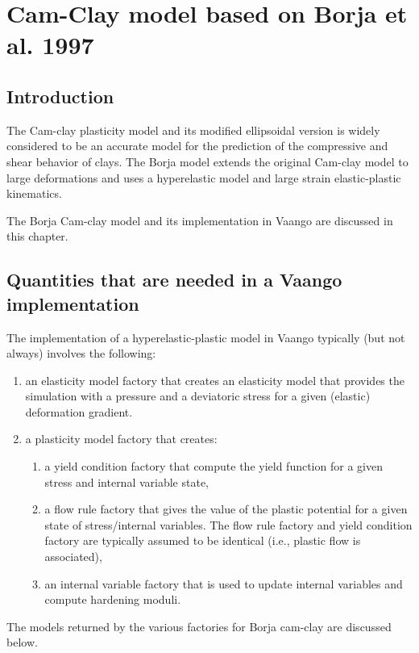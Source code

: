 \chapter{Cam-Clay model based on Borja et al. 1997}

\section{Introduction}
The Cam-clay plasticity model and its modified ellipsoidal version \cite{roscoe1963,roscoe1968,schofield1968,wroth1986} is widely considered to be an accurate model for the prediction of the compressive and shear behavior of clays.  The Borja model \cite{borja1990,borja1991,borja1997,borja1998} extends the original Cam-clay model to large deformations and uses a hyperelastic model and large strain elastic-plastic kinematics.

The Borja Cam-clay model and its implementation in Vaango are discussed in this chapter.

\section{Quantities that are needed in a Vaango implementation}
The implementation of a hyperelastic-plastic model in Vaango typically (but not always) involves the following:
\begin{enumerate}
  \item an elasticity model factory that creates an elasticity model that provides the simulation with a pressure and a deviatoric stress for a given (elastic) deformation gradient.
  \item a plasticity model factory that creates:
        \begin{enumerate}
          \item a yield condition factory that compute the yield function for a given stress and internal variable state,
          \item a flow rule factory that gives the value of the plastic potential for a given state of stress/internal variables.  The flow rule factory and yield condition factory are typically assumed to be identical (i.e., plastic flow is associated),
          \item an internal variable factory that is used to update internal variables and compute hardening moduli.
        \end{enumerate}
\end{enumerate}
The models returned by the various factories for Borja cam-clay are discussed below.

